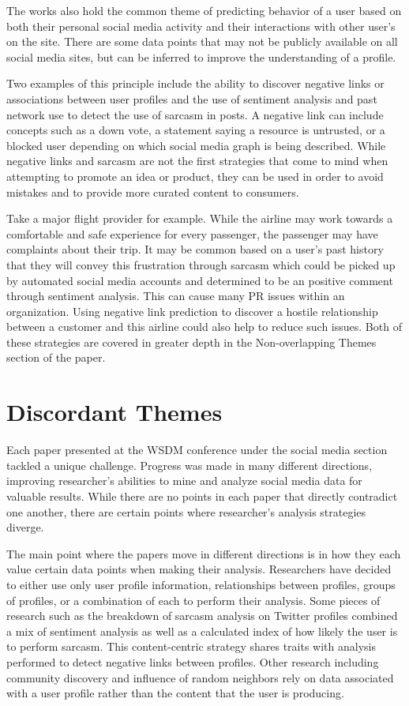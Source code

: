 \documentclass{sig-alternate}
\begin{document}
The works also hold the common theme of predicting behavior of a user based on both their personal social
media activity and their interactions with other user's on the site. There are some data points that may not
be publicly available on all social media sites, but can be inferred to improve the understanding of a profile.

Two examples of this principle include the ability to discover negative links or associations between user profiles 
\cite{Tang:2015:NLP:2684822.2685295}
and the use of sentiment analysis and past network use to detect the use of sarcasm in posts. A negative link
can include concepts such as a down vote, a statement saying a resource is untrusted, or a blocked user
depending on which social media graph is being described. While negative links and sarcasm are not the first
strategies that come to mind when attempting to promote an idea or product, they can be used in order to 
avoid mistakes and to provide more curated content to consumers. 

Take a major flight provider for example. While the airline may work towards a comfortable and safe experience
for every passenger, the passenger may have complaints about their trip. It may be common based on a 
user's past history that they will convey this frustration through sarcasm which could be picked up by automated
social media accounts and determined to be an positive comment through sentiment analysis. This can cause
many PR issues within an organization. Using negative link prediction to discover a hostile relationship between
a customer and this airline could also help to reduce such issues. Both of these strategies are covered in greater depth
in the Non-overlapping Themes section of the paper.

\section{Discordant Themes}
\label{discordant themes}
Each paper presented at the WSDM conference under the social media section tackled a unique challenge. 
Progress was made in many different directions,
improving researcher's abilities to mine and analyze social media data for valuable results. While there
are no points in each paper that directly contradict one another, there are certain points where
researcher's analysis strategies diverge.

The main point where the papers move in different directions is in how they each value certain data
points when making their analysis. Researchers have decided to either use only user profile information, 
relationships between profiles, groups of profiles, or a combination of each to perform their analysis. 
Some pieces of research such as the breakdown of sarcasm analysis on Twitter profiles combined a mix
of sentiment analysis as well as a calculated index of how likely the user is to perform sarcasm. This content-centric
strategy shares traits with analysis performed to detect negative links between profiles. Other research including community
discovery and influence of random neighbors rely on data associated with a user profile rather 
than the content that the user is producing.
\end{document}
